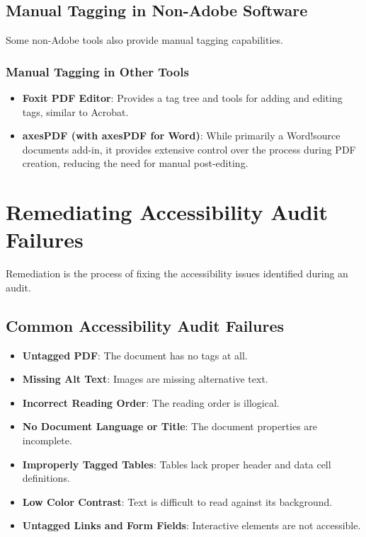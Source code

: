 \subsection{Manual Tagging in Non-Adobe Software}
\label{subsec:manual-tagging-non-adobe}
Some non-Adobe tools also provide manual tagging capabilities.

\subsubsection{Manual Tagging in Other Tools}
\label{ssubsec:manual-tagging-other-tools}
\begin{itemize}
	\item \textbf{Foxit PDF Editor}: Provides a tag tree and tools for adding and editing tags, similar to Acrobat.
	\item \textbf{axesPDF (with axesPDF for Word)}: While primarily a Word!source documents add-in, it provides extensive control over the process during PDF creation, reducing the need for manual post-editing.
\end{itemize}

\section{Remediating Accessibility Audit Failures}
\label{sec:remediating-audit-failures}
Remediation is the process of fixing the accessibility issues identified during an audit.

\subsection{Common Accessibility Audit Failures}
\label{subsec:common-audit-failures}
\begin{itemize}
	\item \textbf{Untagged PDF}: The document has no tags at all.
	\item \textbf{Missing Alt Text}: Images are missing alternative text.
	\item \textbf{Incorrect Reading Order}: The reading order is illogical.
	\item \textbf{No Document Language or Title}: The document properties are incomplete.
	\item \textbf{Improperly Tagged Tables}: Tables lack proper header and data cell definitions.
	\item \textbf{Low Color Contrast}: Text is difficult to read against its background.
	\item \textbf{Untagged Links and Form Fields}: Interactive elements are not accessible.
\end{itemize}

